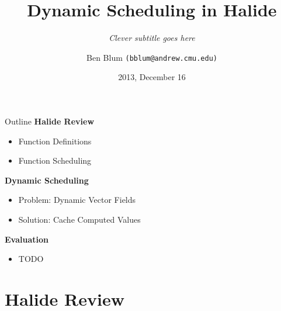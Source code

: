 \documentclass[xcolor=dvipsnames]{beamer}
\title[Dynamic Scheduling in Halide]{{\bf Dynamic Scheduling in Halide}}
\subtitle[]{ {\em Clever subtitle goes here}}
\author[Ben Blum]{Ben Blum \texttt{(bblum@andrew.cmu.edu)}}
\institute[CMU]{Carnegie Mellon University}
\date[]{2013, December 16}
\begin{document}
\renewcommand{\inserttotalframenumber}{28}
\normalem
\begin{frame}
	\titlepage
\end{frame}


\newcommand\linegap{\vspace{0.2in}}
\newcommand\breakslide[1]{\begin{frame}{} \begin{center} \Large #1 \end{center} \end{frame}}
\newcommand\related[1]{\textsuperscript{\em [#1]}}
\newcommand\hilight[2]{\color{#1}#2\color{black}}

\begin{frame}{Outline}
	\textbf{Halide Review}
	\begin{itemize}
		\item Function Definitions
		\item Function Scheduling
	\end{itemize}
	\linegap

	{\bf Dynamic Scheduling}
	\begin{itemize}
		\item Problem: Dynamic Vector Fields
		\item Solution: Cache Computed Values
	\end{itemize}
	\linegap

	{\bf Evaluation}
	\begin{itemize}
		\item TODO
	\end{itemize}
\end{frame}

\section{Halide Review}

\newcommand\code[1]{{\begin{center}\fbox{\begin{tabular}{l} #1 \end{tabular}} \end{center}}}
\end{document}
